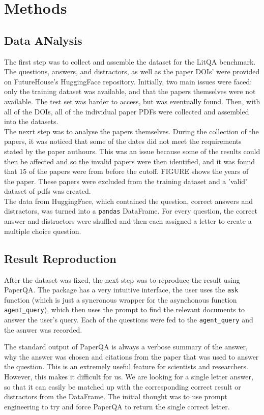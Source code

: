 \section{Methods}
\label{sec:methods}

\subsection{Data ANalysis}
The first step was to collect and assemble the dataset for the LitQA benchmark. 
The questions, answers, and distractors, as well as the paper DOIs' were provided on FutureHouse's HuggingFace repository. 
Initially, two main issues were faced: only the training dataset was available, and that the papers themselves were not available. The test set was harder to access, but was eventually found. Then, with all of the DOIs, all of the individual paper PDFs were collected and assembled into the datasets. \\

The nexrt step was to analyse the papers themselves. During the collection of the papers, it was noticed that some of the dates did not meet the requirements stated by the paper authours. This was an issue because some of the results could then be affected and so the invalid papers were then identified, and it was found that 15 of the papers were from before the cutoff. FIGURE shows the years of the paper. These papers were excluded from the training dataset and a 'valid' dataset of pdfs was created. \\

The data from HuggingFace, which contained the question, correct answers and distractors, was turned into a \texttt{pandas} DataFrame. For every question, the correct answer and distractors were shuffled and then each assigned a letter to create a multiple choice question.

\subsection{Result Reproduction}
After the dataset was fixed, the next step was to reproduce the result using PaperQA.
The package has a very intuitive interface, the user uses the \texttt{ask} function (which is just a syncronous wrapper for the asynchonous function \texttt{agent\_query}), which then uses the prompt to find the relevant documents to answer the user's query. Each of the questions were fed to the \texttt{agent_query} and the asnwer was recorded.

The standard output of PaperQA is always a verbose summary of the answer, why the answer was chosen and citations from the paper that was used to answer the question. This is an extremely useful feature for scientists and researchers. 
However, this makes it difficult for us. We are looking for a single letter answer, so that it can easily be matched up with the corresponding correct result or distractors from the DataFrame. The initial thought was to use prompt engineering to try and force PaperQA to return the single correct letter. 

